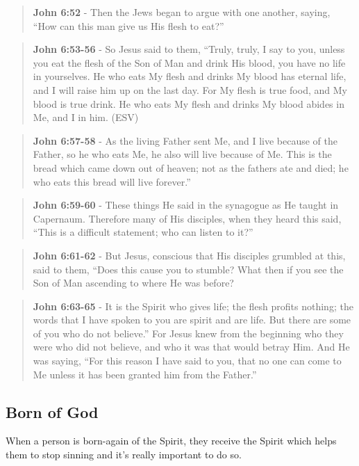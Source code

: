 \documentclass[11pt]{article}
\begin{document}
\begin{quote}
\textbf{John 6:52} - Then the Jews began to argue with one another, saying, “How can this man give us His flesh to eat?”
\end{quote}

\begin{quote}
\textbf{John 6:53-56} - So Jesus said to them, “Truly, truly, I say to you, unless you eat the flesh of the Son of Man and drink His blood, you have no life in yourselves. He who eats My flesh and drinks My blood has eternal life, and I will raise him up on the last day. For My flesh is true food, and My blood is true drink. He who eats My flesh and drinks My blood abides in Me, and I in him. (ESV)
\end{quote}

\begin{quote}
\textbf{John 6:57-58} - As the living Father sent Me, and I live because of the Father, so he who eats Me, he also will live because of Me. This is the bread which came down out of heaven; not as the fathers ate and died; he who eats this bread will live forever.”
\end{quote}

\begin{quote}
\textbf{John 6:59-60} - These things He said in the synagogue as He taught in Capernaum. Therefore many of His disciples, when they heard this said, “This is a difficult statement; who can listen to it?”
\end{quote}

\begin{quote}
\textbf{John 6:61-62} - But Jesus, conscious that His disciples grumbled at this, said to them, “Does this cause you to stumble? What then if you see the Son of Man ascending to where He was before?
\end{quote}

\begin{quote}
\textbf{John 6:63-65} - It is the Spirit who gives life; the flesh profits nothing; the words that I have spoken to you are spirit and are life. But there are some of you who do not believe.” For Jesus knew from the beginning who they were who did not believe, and who it was that would betray Him. And He was saying, “For this reason I have said to you, that no one can come to Me unless it has been granted him from the Father.”
\end{quote}

\subsection{Born of God}
\label{sec:org8f21f95}
When a person is born-again of the Spirit, they receive the Spirit which helps them to stop sinning and it's really important to do so.
\end{document}
